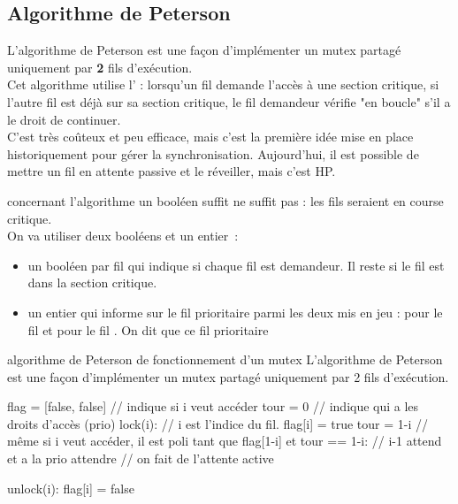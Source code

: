\begin{adjustwidth}{-3cm}{-3cm}
\subsection{Algorithme de Peterson}

L'algorithme de Peterson est une façon d'implémenter un mutex partagé uniquement par \textbf{2} fils d'exécution.\\
Cet algorithme utilise l' : lorsqu'un fil  demande l'accès à une section critique, si l'autre fil  est déjà sur sa section critique, le fil demandeur  vérifie "en boucle" s'il a le droit de continuer.\\
C'est très coûteux et peu efficace, mais c'est la première idée mise en place historiquement pour gérer la synchronisation. Aujourd'hui, il est possible de mettre un fil en attente passive et le réveiller, mais c'est HP.

\begin{remarque}{}{concernant l'algorithme}
    un booléen suffit ne suffit pas : les fils seraient en course critique.\\
    On va utiliser deux booléens et un entier~:
    \begin{itemize}
        \item un booléen par fil qui indique si chaque fil est demandeur. Il reste  si le fil est dans la section critique.
        \item un entier qui informe sur le fil prioritaire parmi les deux mis en jeu :  pour le fil  et  pour le fil . On dit que ce fil prioritaire 
    \end{itemize}
\end{remarque}

\begin{implementation}{algorithme de Peterson de fonctionnement d'un mutex}
    L'algorithme de Peterson est une façon d'implémenter un mutex partagé uniquement par 2 fils d'exécution.
    \begin{lstLNat}
    flag = [false, false]  // indique si i veut accéder
    tour = 0               // indique qui a les droits d'accès (prio)
    lock(i):               // i est l'indice du fil.
        flag[i] = true
        tour = 1-i         // même si i veut accéder, il est poli
        tant que flag[1-i] et tour == 1-i: // i-1 attend et a la prio
            attendre       // on fait de l'attente active
    
    unlock(i):
        flag[i] = false
    \end{lstLNat}
\end{implementation}


\end{adjustwidth}
